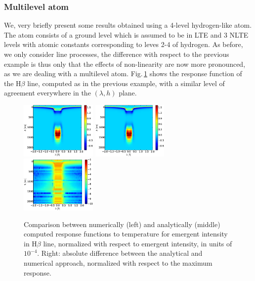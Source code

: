 \documentclass{aa}
\begin{document}
\subsubsection{Multilevel atom}
We, very briefly present some results obtained using a 4-level hydrogen-like atom. The atom consists of a ground level which is assumed to be in LTE and 3 NLTE levels with atomic constants corresponding to leves 2-4 of hydrogen. As before, we only consider line processes, the difference with respect to the previous example is thus only that the effects of non-linearity are now more pronounced, as we are dealing with a multilevel atom. Fig.\,\ref{example_2} shows the response function of the H$\beta$ line, computed as in the previous example, with a similar level of agreement everywhere in the $(\lambda,h)$ plane.

\begin{figure}
 \includegraphics[width = 0.33\textwidth]{figs/ex_2_numerical_responses_intensity_temperature.eps}
 \includegraphics[width = 0.33\textwidth]{figs/ex_2_analytical_responses_intensity_temperature.eps}
 \includegraphics[width = 0.33\textwidth]{figs/ex_2_relative_difference_responses_intensity_temperature.eps}
 \caption{Comparison between numerically (left) and analytically (middle) computed response functions to temperature for emergent intensity in H$\beta$ line, normalized with respect to emergent intensity, in units of $10^{-4}$. Right: absolute difference between the analytical and numerical approach, normalized with respect to the maximum response.}
 \label{example_2}
\end{figure}
\end{document}
